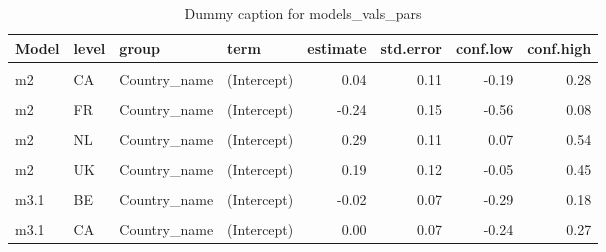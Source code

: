 \begin{table}
\centering
\caption{Dummy caption for models_vals_pars}
\centering
\fontsize{10}{12}\selectfont
\begin{tabular}[t]{llllrrrr}
\toprule
Model & level & group & term & estimate & std.error & conf.low & conf.high\\
\midrule
\cellcolor{gray!10}{m2} & \cellcolor{gray!10}{BE} & \cellcolor{gray!10}{Country\_name} & \cellcolor{gray!10}{(Intercept)} & \cellcolor{gray!10}{-0.14} & \cellcolor{gray!10}{0.11} & \cellcolor{gray!10}{-0.37} & \cellcolor{gray!10}{0.09}\\
m2 & CA & Country\_name & (Intercept) & 0.04 & 0.11 & -0.19 & 0.28\\
\cellcolor{gray!10}{m2} & \cellcolor{gray!10}{CH} & \cellcolor{gray!10}{Country\_name} & \cellcolor{gray!10}{(Intercept)} & \cellcolor{gray!10}{0.21} & \cellcolor{gray!10}{0.14} & \cellcolor{gray!10}{-0.08} & \cellcolor{gray!10}{0.53}\\
m2 & FR & Country\_name & (Intercept) & -0.24 & 0.15 & -0.56 & 0.08\\
\cellcolor{gray!10}{m2} & \cellcolor{gray!10}{IL} & \cellcolor{gray!10}{Country\_name} & \cellcolor{gray!10}{(Intercept)} & \cellcolor{gray!10}{-0.03} & \cellcolor{gray!10}{0.22} & \cellcolor{gray!10}{-0.55} & \cellcolor{gray!10}{0.47}\\
m2 & NL & Country\_name & (Intercept) & 0.29 & 0.11 & 0.07 & 0.54\\
\cellcolor{gray!10}{m2} & \cellcolor{gray!10}{SE} & \cellcolor{gray!10}{Country\_name} & \cellcolor{gray!10}{(Intercept)} & \cellcolor{gray!10}{-0.23} & \cellcolor{gray!10}{0.12} & \cellcolor{gray!10}{-0.49} & \cellcolor{gray!10}{0.01}\\
m2 & UK & Country\_name & (Intercept) & 0.19 & 0.12 & -0.05 & 0.45\\
\cellcolor{gray!10}{m2} & \cellcolor{gray!10}{US} & \cellcolor{gray!10}{Country\_name} & \cellcolor{gray!10}{(Intercept)} & \cellcolor{gray!10}{-0.05} & \cellcolor{gray!10}{0.11} & \cellcolor{gray!10}{-0.29} & \cellcolor{gray!10}{0.20}\\
m3.1 & BE & Country\_name & (Intercept) & -0.02 & 0.07 & -0.29 & 0.18\\
\cellcolor{gray!10}{m3.1} & \cellcolor{gray!10}{BE} & \cellcolor{gray!10}{Country\_name} & \cellcolor{gray!10}{EPS} & \cellcolor{gray!10}{-0.04} & \cellcolor{gray!10}{0.04} & \cellcolor{gray!10}{-0.13} & \cellcolor{gray!10}{0.06}\\
m3.1 & CA & Country\_name & (Intercept) & 0.00 & 0.07 & -0.24 & 0.27\\

\end{tabular}
\end{table}
